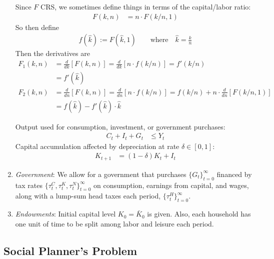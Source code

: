 \documentclass[12pt]{article}
\theoremstyle{plain}
\theoremstyle{definition}
\theoremstyle{remark}
\newcommand{\tinfz}{^\infty_{t=0}}
\begin{document}
\begin{enumerate}
    Since $F$ CRS, we sometimes define things in terms of the
    capital/labor ratio:
    \begin{align*}
      F(k,n) &= n \cdot F(k/n,1)
    \end{align*}
    So then define
    \begin{align*}
      f(\hat{k}) := F(\hat{k},1)
      \qquad\text{where}\quad
      \hat{k} = \frac{k}{n}
    \end{align*}
    Then the derivatives are
    \begin{align*}
      F_1(k,n)
      &=
      \frac{d}{dk}[F(k,n)]
      =
      \frac{d}{dk}[n\cdot f(k/n)]
      = f'(k/n) \\
      &= f'(\hat{k}) \\
      F_2(k,n)
      &=
      \frac{d}{dn}[F(k,n)]
      =
      \frac{d}{dn}[n\cdot f(k/n)]
      = f(k/n) +
      n\cdot
      \frac{d}{dn}[F(k/n,1)] \\
      &= f(\hat{k}) - f'(\hat{k})\cdot \hat{k}
    \end{align*}

    Output used for consumption, investment, or government purchases:
    \begin{align*}
      C_t + I_t + G_t &\leq Y_t
    \end{align*}
    Capital accumulation affected by depreciation at rate
    $\delta\in[0,1]$:
    \begin{align*}
      K_{t+1} &= (1-\delta)K_t + I_t
    \end{align*}

  \item \emph{Government}:
    We allow for a government that purchases $\{G_t\}\tinfz$ financed by
    tax rates $\{\tau_t^C,\tau_t^K,\tau_t^N\}\tinfz$ on consumption,
    earnings from capital, and wages, along with a lump-sum head taxes
    each period, $\{\tau^H_t\}\tinfz$.

  \item \emph{Endowments}:
    Initial capital level $K_0=\bar{K}_0$ is given.
    Also, each household has one unit of time to be split among labor
    and leisure each period.
\end{enumerate}



\clearpage
\subsection{Social Planner's Problem}
\end{document}
